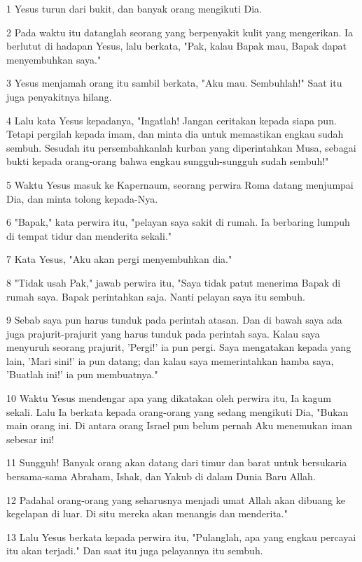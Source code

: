 \par 1 Yesus turun dari bukit, dan banyak orang mengikuti Dia.
\par 2 Pada waktu itu datanglah seorang yang berpenyakit kulit yang mengerikan. Ia berlutut di hadapan Yesus, lalu berkata, "Pak, kalau Bapak mau, Bapak dapat menyembuhkan saya."
\par 3 Yesus menjamah orang itu sambil berkata, "Aku mau. Sembuhlah!" Saat itu juga penyakitnya hilang.
\par 4 Lalu kata Yesus kepadanya, "Ingatlah! Jangan ceritakan kepada siapa pun. Tetapi pergilah kepada imam, dan minta dia untuk memastikan engkau sudah sembuh. Sesudah itu persembahkanlah kurban yang diperintahkan Musa, sebagai bukti kepada orang-orang bahwa engkau sungguh-sungguh sudah sembuh!"
\par 5 Waktu Yesus masuk ke Kapernaum, seorang perwira Roma datang menjumpai Dia, dan minta tolong kepada-Nya.
\par 6 "Bapak," kata perwira itu, "pelayan saya sakit di rumah. Ia berbaring lumpuh di tempat tidur dan menderita sekali."
\par 7 Kata Yesus, "Aku akan pergi menyembuhkan dia."
\par 8 "Tidak usah Pak," jawab perwira itu, "Saya tidak patut menerima Bapak di rumah saya. Bapak perintahkan saja. Nanti pelayan saya itu sembuh.
\par 9 Sebab saya pun harus tunduk pada perintah atasan. Dan di bawah saya ada juga prajurit-prajurit yang harus tunduk pada perintah saya. Kalau saya menyuruh seorang prajurit, 'Pergi!' ia pun pergi. Saya mengatakan kepada yang lain, 'Mari sini!' ia pun datang; dan kalau saya memerintahkan hamba saya, 'Buatlah ini!' ia pun membuatnya."
\par 10 Waktu Yesus mendengar apa yang dikatakan oleh perwira itu, Ia kagum sekali. Lalu Ia berkata kepada orang-orang yang sedang mengikuti Dia, "Bukan main orang ini. Di antara orang Israel pun belum pernah Aku menemukan iman sebesar ini!
\par 11 Sungguh! Banyak orang akan datang dari timur dan barat untuk bersukaria bersama-sama Abraham, Ishak, dan Yakub di dalam Dunia Baru Allah.
\par 12 Padahal orang-orang yang seharusnya menjadi umat Allah akan dibuang ke kegelapan di luar. Di situ mereka akan menangis dan menderita."
\par 13 Lalu Yesus berkata kepada perwira itu, "Pulanglah, apa yang engkau percayai itu akan terjadi." Dan saat itu juga pelayannya itu sembuh.
